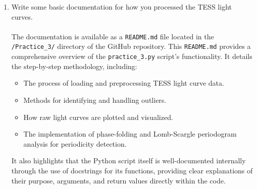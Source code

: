 \documentclass[a4paper,12pt]{article}
\DeclareRobustCommand{\regular}{\fontseries{m}\selectfont}
\DeclareRobustCommand{\bold}{\fontseries{b}\selectfont}
\newcommand{\bcode}[1]{\texttt{\fontsize{11}{13}\selectfont\bold#1}}
\newenvironment{solution}{}{}
\begin{document}
\begin{enumerate}
\begin{solution}
\begin{itemize}
                maintainer of this repository.
            \end{itemize}
            As an important note regarding the repository's contents, the local
            course directory was restructured for easier navigation and file access
            during my work. As a consequence, all the scripts (\bcode{.sh} and \bcode{.py})
            and \LaTeX{} files in the \bcode{/Practices/} subdirectory had to be updated
            to reflect these changes in order to prevent compiling errors. However,
            for transparency purposes, any code presented directly within the \LaTeX{}
            files in the submitted solutions has not been updated to reflect these
            modified scripts, preserving the original practice solutions as initially
            developed.
        \end{solution}\vspace{-0.5em}
        \item Write some basic documentation for how you processed the TESS light
        curves.
        \begin{solution}
            \\\\\regular The documentation is available as a \bcode{README.md}
            file located in the \bcode{/Practice\_3/} directory of the GitHub
            repository. This \bcode{README.md} provides a comprehensive overview
            of the \bcode{practice\_3.py} script's functionality. It details the
            step-by-step methodology, including:
            \begin{itemize}
                \item The process of loading and preprocessing TESS light curve
                data.
                \item Methods for identifying and handling outliers.
                \item How raw light curves are plotted and visualized.
                \item The implementation of phase-folding and Lomb-Scargle
                periodogram analysis for periodicity detection.
            \end{itemize}
            It also highlights that the Python script itself is well-documented
            internally through the use of docstrings for its functions, providing
            clear explanations of their purpose, arguments, and return values
            directly within the code.


\end{solution}
\end{enumerate}
\end{document}
